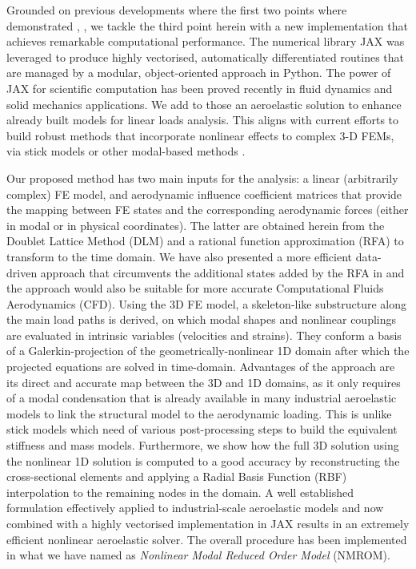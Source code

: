 \documentclass[11pt]{article}
\begin{document}
Grounded on previous developments where the first two points where demonstrated \cite{PALACIOS2019}, \cite{CEA2021}, \cite{CEA2023} we tackle the third point herein with a new implementation that achieves remarkable computational performance.
The numerical library JAX \cite{jax2018github} was leveraged to produce highly vectorised, automatically differentiated routines that are managed by a modular, object-oriented approach in Python. The power of JAX for scientific computation has been proved recently in fluid dynamics \cite{BEZGIN2023} and solid mechanics \cite{XUE2023} applications. We add to those an aeroelastic solution to enhance already built models for linear loads analysis. This aligns with current efforts to build robust methods that incorporate nonlinear effects to complex 3-D FEMs, via stick models \cite{RISO2023} or other modal-based methods \cite{DRACHINSKY2022}.

Our proposed method has two main inputs for the analysis: a linear (arbitrarily complex) FE model, and aerodynamic influence coefficient matrices that provide the mapping between FE states and the corresponding aerodynamic forces (either in modal or in physical coordinates). The latter are obtained herein from the Doublet Lattice Method (DLM) and a rational function approximation (RFA) \cite{ROGER1975} to transform to the time domain. We have also presented a more efficient data-driven approach that circumvents the additional states added by the RFA in \cite{PALACIOS2023b} and the approach would also be suitable for more accurate Computational Fluids Aerodynamics (CFD). Using the 3D FE model, a skeleton-like substructure along the main load paths is derived, on which modal shapes and nonlinear couplings are evaluated in intrinsic variables (velocities and strains). They conform a basis of a Galerkin-projection of the geometrically-nonlinear 1D domain after which the projected equations are solved in time-domain. Advantages of the approach are its direct and accurate map between the 3D and 1D domains, as it only requires of a modal condensation that is already available in many industrial aeroelastic models to link the structural model to the aerodynamic loading.
This is unlike stick models which need of various post-processing steps to build the equivalent stiffness and mass models.
Furthermore, we show how the full 3D solution using the nonlinear 1D solution is computed to a good accuracy by reconstructing the cross-sectional elements and applying a Radial Basis Function (RBF) interpolation to the remaining nodes in the domain.
A well established formulation effectively applied to industrial-scale aeroelastic models and now combined with a highly vectorised implementation in JAX results in an extremely efficient nonlinear aeroelastic solver. The overall procedure has been implemented in what we have named as \emph{Nonlinear Modal Reduced Order Model} (NMROM). 
\end{document}
